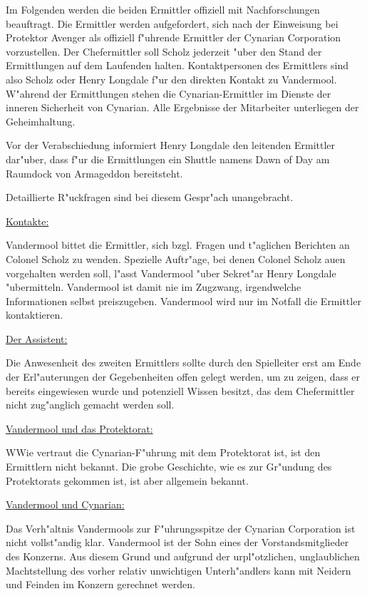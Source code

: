 Im Folgenden werden die beiden Ermittler offiziell mit Nachforschungen beauftragt. Die Ermittler werden aufgefordert, sich nach der Einweisung bei Protektor Avenger als offiziell f"uhrende Ermittler der Cynarian Corporation vorzustellen. Der Chefermittler soll Scholz jederzeit "uber den Stand der Ermittlungen auf dem Laufenden halten. Kontaktpersonen des Ermittlers sind also Scholz oder Henry Longdale f"ur den direkten Kontakt zu Vandermool. W"ahrend der Ermittlungen stehen die Cynarian-Ermittler im Dienste der inneren Sicherheit von Cynarian. Alle Ergebnisse der Mitarbeiter unterliegen der Geheimhaltung.

Vor der Verabschiedung informiert Henry Longdale den leitenden Ermittler dar"uber, dass f"ur die Ermittlungen ein Shuttle namens Dawn of Day am Raumdock von Armageddon bereitsteht.


\begin{remarks}	
	Detaillierte R"uckfragen sind bei diesem Gespr"ach unangebracht. 
	
	\underline{Kontakte:}

	Vandermool bittet die Ermittler, sich bzgl. Fragen und t"aglichen Berichten an Colonel Scholz zu wenden. Spezielle Auftr"age, bei denen Colonel Scholz au\3en vorgehalten werden soll, l"asst Vandermool "uber Sekret"ar Henry Longdale "ubermitteln. Vandermool ist damit nie im Zugzwang, irgendwelche Informationen selbst preiszugeben. Vandermool wird nur im Notfall die Ermittler kontaktieren.

	\underline{Der Assistent:}

	Die Anwesenheit des zweiten Ermittlers sollte durch den Spielleiter erst am Ende der Erl"auterungen der Gegebenheiten offen gelegt werden, um zu zeigen, dass er bereits eingewiesen wurde und potenziell Wissen besitzt, das dem Chefermittler nicht zug"anglich gemacht werden soll.

	\underline{Vandermool und das Protektorat:}

	WWie vertraut die Cynarian-F"uhrung mit dem Protektorat ist, ist den Ermittlern nicht bekannt. Die grobe Geschichte, wie es zur Gr"undung des Protektorats gekommen ist, ist aber allgemein bekannt.

	\underline{Vandermool und Cynarian:}

	Das Verh"altnis Vandermools zur F"uhrungsspitze der Cynarian Corporation ist nicht vollst"andig klar. Vandermool ist der Sohn eines der Vorstandsmitglieder des Konzerns. Aus diesem Grund und aufgrund der urpl"otzlichen, unglaublichen Machtstellung des vorher relativ unwichtigen Unterh"andlers kann mit Neidern und Feinden im Konzern gerechnet werden.
\end{remarks}

